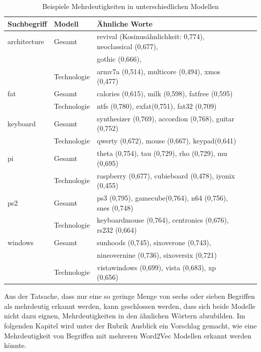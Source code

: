 \documentclass[12pt,a4paper]{report}
\begin{document}
		\begin{table}[H]
\caption{Beispiele Mehrdeutigkeiten in unterschiedlichen Modellen}
\label{tab:bspJeEinModellMehrdeutig}
\begin{center}
\begin{tabular}{|l||l|l|l|l|}
\hline
\textbf{Suchbegriff} & \textbf{Modell} & \textbf{Ähnliche Worte}   \\
\hline

 
architecture & Gesamt		&  revival (Kosinusähnlichkeit: 0,774), neoclassical (0,677), \\
&				&  gothic (0,666),  \\
&Technologie 	&  armv7a (0,514), multicore (0,494), xmos (0,477)\\
\hline
fat & Gesamt		&  calories (0,615), milk (0,598), fatfree (0,595) \\
&Technologie 	&  ntfs (0,780), exfat(0,751), fat32 (0,709) \\
\hline
 keyboard & Gesamt		&  synthesizer (0,769), accordion (0,768), guitar (0,752)\\
&Technologie 	&  qwerty (0,672), mouse (0,667), keypad(0,641)\\
\hline
pi  & Gesamt	 &  theta (0,754), tau (0,729), rho (0,729), mu (0,695)\\
 &  Technologie  &  raspberry (0,677), cubieboard (0,478), iyonix (0,455)\\
 \hline
 ps2 & Gesamt		&  ps3 (0,795), gamecube(0,764), n64 (0,756), snes (0,748)\\

&Technologie 	&  keyboardmouse (0,764), centronics (0,676), rs232 (0,664)\\
\hline
 windows & Gesamt		&  sunhoods (0,745), sixoverone (0,743), \\
&				&  nineovernine (0,736), sixoversix (0,721)  \\
&Technologie 	&  vistawindows (0,699), vista (0,683), xp (0,656)\\
\hline
\end{tabular}
\end{center}
\end{table}
		

				
		Aus der Tatsache, dass nur eine so geringe Menge von sechs oder sieben Begriffen als mehrdeutig erkannt werden, kann geschlossen werden, dass sich beide Modelle nicht dazu eignen, Mehrdeutigkeiten in den ähnlichen Wörtern abzubilden. Im folgenden Kapitel wird unter der Rubrik Ausblick ein Vorschlag gemacht, wie eine Mehrdeutigkeit von Begriffen mit mehreren Word2Vec Modellen erkannt werden könnte.
		
\end{document}

